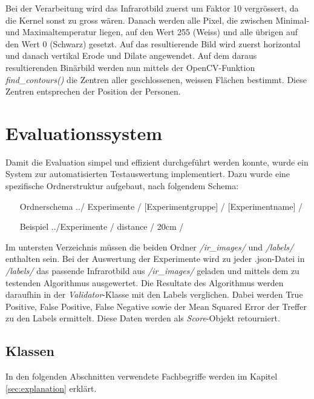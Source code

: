 \noindent
Bei der Verarbeitung wird das Infrarotbild zuerst um Faktor 10 vergrössert, da die Kernel sonst zu gross wären. Danach werden alle Pixel, die zwischen Minimal- und Maximaltemperatur liegen, auf den Wert 255 (Weiss) und alle übrigen auf den Wert 0 (Schwarz) gesetzt. Auf das resultierende Bild wird zuerst horizontal und danach vertikal \gls{Erode} und \gls{Dilate} angewendet. Auf dem daraus resultierenden Binärbild werden nun mittels der OpenCV-Funktion \textit{find\_contours()} die Zentren aller geschlossenen, weissen Flächen bestimmt. Diese Zentren entsprechen der Position der Personen.


\section{Evaluationssystem}

Damit die Evaluation simpel und effizient durchgeführt werden konnte, wurde ein System zur automatisierten Testauswertung implementiert. Dazu wurde eine spezifische Ordnerstruktur aufgebaut, nach folgendem Schema:

\begin{itemize}[leftmargin=4cm, align=left, labelsep=*, labelwidth=*]
	\item[Ordnerschema] ../ Experimente / [Experimentgruppe] / [Experimentname] /
	\item[Beispiel] ../Experimente / distance / 20cm / 
\end{itemize}

\noindent
Im untersten Verzeichnis müssen die beiden Ordner \textit{/ir\_images/} und \textit{/labels/} enthalten sein. Bei der Auswertung der Experimente wird zu jeder .json-Datei in \textit{/labels/} das passende Infrarotbild aus \textit{/ir\_images/} geladen und mittels dem zu testenden Algorithmus ausgewertet. Die Resultate des Algorithmus werden daraufhin in der \textit{Validator}-Klasse mit den Labels verglichen. Dabei werden True Positive, False Positive, False Negative sowie der Mean Squared Error der Treffer zu den Labels ermittelt. Diese Daten werden als \textit{Score}-Objekt retourniert.\\

\subsection{Klassen}

In den folgenden Abschnitten verwendete Fachbegriffe werden im Kapitel \ref{sec:explanation} erklärt.

